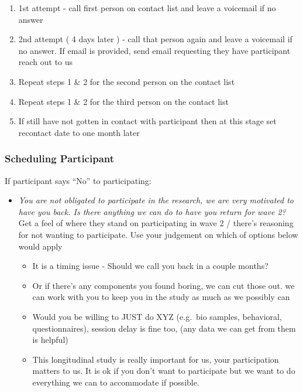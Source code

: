 \documentclass[]{book}
\providecommand{\tightlist}{%
  \setlength{\itemsep}{0pt}\setlength{\parskip}{0pt}}
\begin{document}
\begin{enumerate}
\def\labelenumi{\arabic{enumi})}
\tightlist
\item
  1st attempt - call first person on contact list and leave a voicemail if no answer
\item
  2nd attempt ( 4 days later ) - call that person again and leave a voicemail if no answer. If email is provided, send email requesting they have participant reach out to us
\item
  Repeat steps 1 \& 2 for the second person on the contact list
\item
  Repeat steps 1 \& 2 for the third person on the contact list
\item
  If still have not gotten in contact with participant then at this stage set recontact date to one month later
\end{enumerate}

\hypertarget{scheduling-participant}{%
\subsubsection{Scheduling Participant}\label{scheduling-participant}}

If participant says ``No'' to participating:

\begin{itemize}
\item
  \emph{You are not obligated to participate in the research, we are very motivated to have you back. Is there anything we can do to have you return for wave 2? } Get a feel of where they stand on participating in wave 2 / there's reasoning for not wanting to participate. Use your judgement on which of options below would apply

  \begin{itemize}
  \item
    It is a timing issue - Should we call you back in a couple months?
  \item
    Or if there's any components you found boring, we can cut those out. we can work with you to keep you in the study as much as we possibly can
  \item
    Would you be willing to JUST do XYZ (e.g.~bio samples, behavioral, questionnaires), session delay is fine too, (any data we can get from them is helpful)
  \item
    This longitudinal study is really important for us, your participation matters to us. It is ok if you don't want to participate but we want to do everything we can to accommodate if possible.
  \end{itemize}
\end{itemize}
\end{document}
